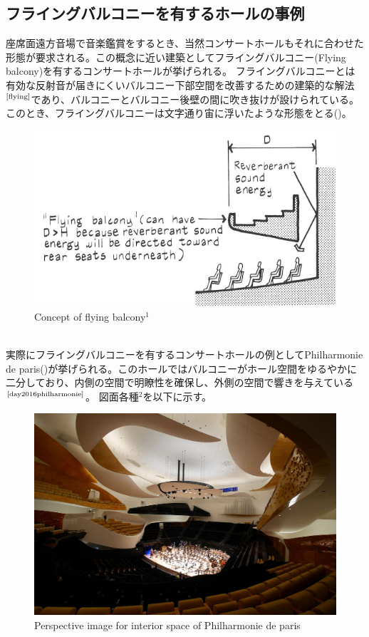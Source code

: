 \pagebreak
\subsection{フライングバルコニーを有するホールの事例}
座席面遠方音場で音楽鑑賞をするとき、当然コンサートホールもそれに合わせた形態が要求される。この概念に近い建築としてフライングバルコニー(Flying balcony)を有するコンサートホールが挙げられる。
フライングバルコニーとは有効な反射音が届きにくいバルコニー下部空間を改善するための建築的な解法$^{\text{\cite{flying}}}$であり、バルコニーとバルコニー後壁の間に吹き抜けが設けられている。このとき、フライングバルコニーは文字通り宙に浮いたような形態をとる()。
\begin{figure}[htbp]
    \centering
    \includegraphics[keepaspectratio,scale=1]{01_att/flyingbalcony.pdf}
    \caption{\hspace{1mm}Concept of flying balcony$^1$}
    \label{fig:flyigbalcony}
\end{figure}
\\ 実際にフライングバルコニーを有するコンサートホールの例としてPhilharmonie de paris()が挙げられる。このホールではバルコニーがホール空間をゆるやかに二分しており、内側の空間で明瞭性を確保し、外側の空間で響きを与えている$^{\text{\cite{day2016philharmonie}}}$。
図面各種$^2$を以下に示す。
\begin{figure}[htbp]
    \centering
    \includegraphics[keepaspectratio,scale=0.2]{01_att/pic_in1.jpg}
    \caption{\hspace{1mm}Perspective image for interior space of Philharmonie de paris}
    \label{fig:pic_in1}
\end{figure}

